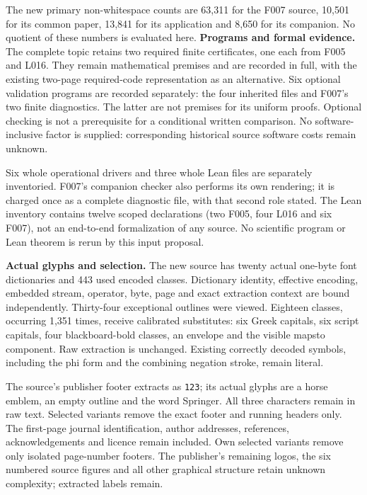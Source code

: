 \documentclass[a4paper,11pt]{article}
\begin{document}
The new primary non-whitespace counts are 63,311 for the F007 source,
10,501 for its common paper, 13,841 for its application and 8,650 for its
companion. No quotient of these numbers is evaluated here.
\newpage
\textbf{Programs and formal evidence.}
The complete topic retains two required finite certificates, one each from
F005 and L016. They remain mathematical premises and are recorded in full,
with the existing two-page required-code representation as an alternative.
Six optional validation programs are recorded separately: the four inherited
files and F007's two finite diagnostics. The latter are not premises for its
uniform proofs. Optional checking is not a prerequisite for a conditional
written comparison. No software-inclusive factor is supplied: corresponding
historical source software costs remain unknown.

Six whole operational drivers and three whole Lean files are separately
inventoried. F007's companion checker also performs its own rendering; it
is charged once as a complete diagnostic file, with that second role stated.
The Lean inventory contains twelve scoped declarations (two F005, four
L016 and six F007), not an end-to-end formalization of any source.
No scientific program or Lean theorem is rerun by this input proposal.

\textbf{Actual glyphs and selection.}
The new source has twenty actual one-byte font dictionaries and 443 used
encoded classes. Dictionary identity, effective encoding, embedded stream,
operator, byte, page and exact extraction context are bound independently.
Thirty-four exceptional outlines were viewed. Eighteen classes, occurring
1,351 times, receive calibrated substitutes: six Greek capitals, six script
capitals, four blackboard-bold classes, an envelope and the visible mapsto
component. Raw extraction is unchanged. Existing correctly decoded symbols,
including the phi form and the combining negation stroke, remain literal.

The source's publisher footer extracts as \texttt{123}; its actual glyphs
are a horse emblem, an empty outline and the word Springer. All three
characters remain in raw text. Selected variants remove the exact footer
and running headers only. The first-page journal identification, author
addresses, references, acknowledgements and licence remain included.
Own selected variants remove only isolated page-number footers. The
publisher's remaining logos, the six numbered source figures and all other
graphical structure retain unknown complexity; extracted labels remain.
\end{document}
